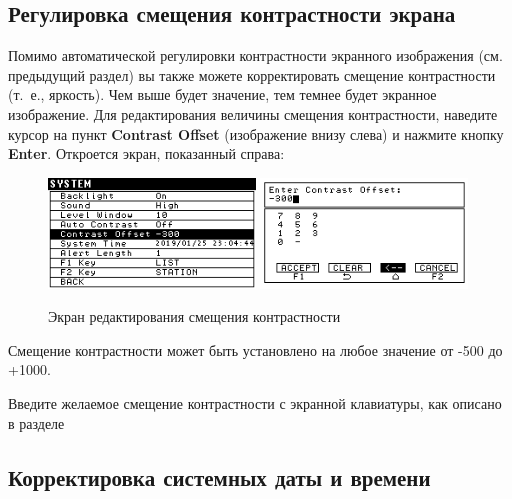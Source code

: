 \subsection{Регулировка смещения контрастности экрана}

Помимо автоматической регулировки контрастности экранного изображения (см.
предыдущий раздел) вы также можете корректировать смещение контрастности (т.~е.,
яркость). Чем выше будет значение, тем темнее будет экранное изображение.  Для
редактирования величины смещения контрастности, наведите курсор на пункт
\textbf{Contrast Offset} (изображение внизу слева) и нажмите кнопку
\textbf{Enter}. Откроется экран, показанный справа:

\begin{figure}[H]
  \centering
  \includegraphics[width=0.49\textwidth]{figures/the_contrast_offset_editing_screen_1}
  \includegraphics[width=0.49\textwidth]{figures/the_contrast_offset_editing_screen_2}
  \caption{Экран редактирования смещения контрастности}
  \label{fig:the_contrast_offset_editing_screen}
\end{figure}

Смещение контрастности может быть установлено на любое значение от -500 до
+1000.

Введите желаемое смещение контрастности с экранной клавиатуры, как описано в
разделе 


\subsection{Корректировка системных даты и времени}


